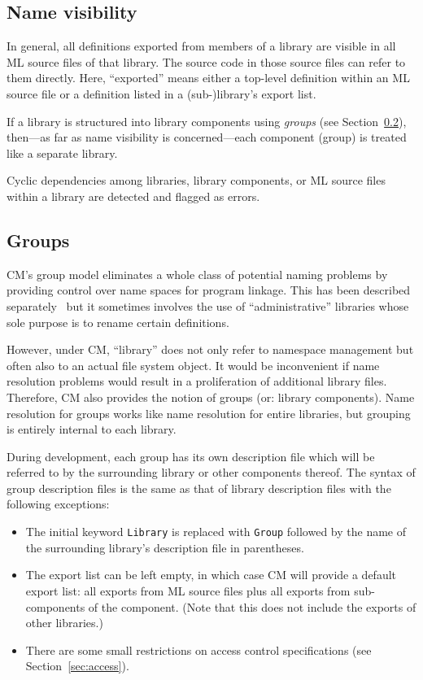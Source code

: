 \documentclass{article}
\begin{document}
\subsection{Name visibility}

In general, all definitions exported from members of a library are
visible in all ML source files of that library.  The source code in
those source files can refer to them directly.  Here, ``exported''
means either a top-level definition within an ML source file or a
definition listed in a (sub-)library's export list.

If a library is structured into library components using {\em groups}
(see Section~\ref{sec:groups}), then---as far as name visibility is
concerned---each component (group) is treated like a separate library.

Cyclic dependencies among libraries, library components, or ML source
files within a library are detected and flagged as errors.

\subsection{Groups}
\label{sec:groups}

CM's group model eliminates a whole class of potential naming problems
by providing control over name spaces for program linkage.  This has
been described separately~\cite{blume:appel:cm99} but it sometimes
involves the use of ``administrative'' libraries whose sole purpose is
to rename certain definitions.

However, under CM, ``library'' does not only refer to namespace
management but often also to an actual file system object.  It would
be inconvenient if name resolution problems would result in a
proliferation of additional library files.  Therefore, CM also
provides the notion of groups (or: library components).  Name
resolution for groups works like name resolution for entire libraries,
but grouping is entirely internal to each library.

During development, each group has its own description file which will
be referred to by the surrounding library or other components thereof.
The syntax of group description files is the same as that of library
description files with the following exceptions:

\begin{itemize}
\item The initial keyword {\tt Library} is replaced with {\tt Group}
followed by the name of the surrounding library's description file in
parentheses.
\item The export list can be left empty, in which case CM will
provide a default export list: all exports from ML source files plus
all exports from sub-components of the component.  (Note that this does
not include the exports of other libraries.)
\item There are some small restrictions on access control
specifications (see Section~\ref{sec:access}).
\end{itemize}
\end{document}
